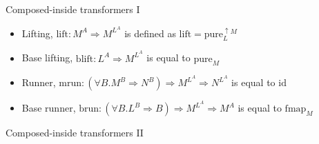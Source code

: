 \documentclass[english]{beamer}
\begin{document}
\begin{frame}{Composed-inside transformers I}
\begin{itemize}
\begin{itemize}
\item Lifting, $\text{lift}:M^{A}\Rightarrow M^{L^{A}}$ is defined as $\text{lift}=\text{pure}_{L}^{\uparrow M}$
\item Base lifting, $\text{blift}:L^{A}\Rightarrow M^{L^{A}}$ is equal
to $\text{pure}_{M}$
\item Runner, $\text{mrun}:\left(\forall B.M^{B}\Rightarrow N^{B}\right)\Rightarrow M^{L^{A}}\Rightarrow N^{L^{A}}$
is equal to $\text{id}$
\item Base runner, $\text{brun}:\left(\forall B.L^{B}\Rightarrow B\right)\Rightarrow M^{L^{A}}\Rightarrow M^{A}$
is equal to $\text{fmap}_{M}$
\end{itemize}
\end{itemize}
\end{frame}

\begin{frame}{Composed-inside transformers II}


\end{frame}
\end{document}
